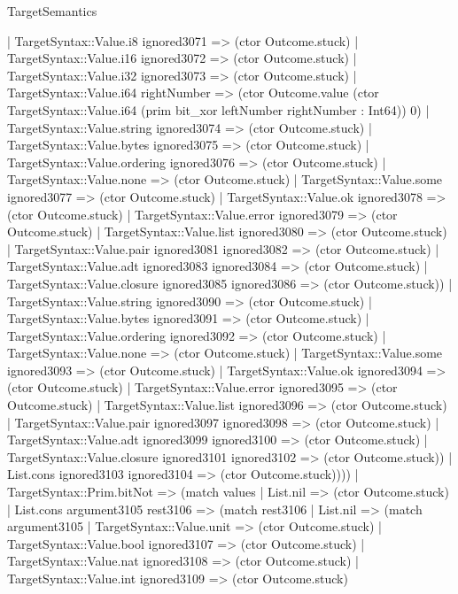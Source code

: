 \begin{lexlean}{TargetSemantics}
\begin{semanticmodule}
{              | TargetSyntax::Value.i8 ignored3071 => (ctor Outcome.stuck)
              | TargetSyntax::Value.i16 ignored3072 => (ctor Outcome.stuck)
              | TargetSyntax::Value.i32 ignored3073 => (ctor Outcome.stuck)
              | TargetSyntax::Value.i64 rightNumber => (ctor Outcome.value (ctor TargetSyntax::Value.i64 (prim bit_xor leftNumber rightNumber : Int64)) 0)
              | TargetSyntax::Value.string ignored3074 => (ctor Outcome.stuck)
              | TargetSyntax::Value.bytes ignored3075 => (ctor Outcome.stuck)
              | TargetSyntax::Value.ordering ignored3076 => (ctor Outcome.stuck)
              | TargetSyntax::Value.none => (ctor Outcome.stuck)
              | TargetSyntax::Value.some ignored3077 => (ctor Outcome.stuck)
              | TargetSyntax::Value.ok ignored3078 => (ctor Outcome.stuck)
              | TargetSyntax::Value.error ignored3079 => (ctor Outcome.stuck)
              | TargetSyntax::Value.list ignored3080 => (ctor Outcome.stuck)
              | TargetSyntax::Value.pair ignored3081 ignored3082 => (ctor Outcome.stuck)
              | TargetSyntax::Value.adt ignored3083 ignored3084 => (ctor Outcome.stuck)
              | TargetSyntax::Value.closure ignored3085 ignored3086 => (ctor Outcome.stuck))
            | TargetSyntax::Value.string ignored3090 => (ctor Outcome.stuck)
            | TargetSyntax::Value.bytes ignored3091 => (ctor Outcome.stuck)
            | TargetSyntax::Value.ordering ignored3092 => (ctor Outcome.stuck)
            | TargetSyntax::Value.none => (ctor Outcome.stuck)
            | TargetSyntax::Value.some ignored3093 => (ctor Outcome.stuck)
            | TargetSyntax::Value.ok ignored3094 => (ctor Outcome.stuck)
            | TargetSyntax::Value.error ignored3095 => (ctor Outcome.stuck)
            | TargetSyntax::Value.list ignored3096 => (ctor Outcome.stuck)
            | TargetSyntax::Value.pair ignored3097 ignored3098 => (ctor Outcome.stuck)
            | TargetSyntax::Value.adt ignored3099 ignored3100 => (ctor Outcome.stuck)
            | TargetSyntax::Value.closure ignored3101 ignored3102 => (ctor Outcome.stuck))
          | List.cons ignored3103 ignored3104 => (ctor Outcome.stuck))))
    | TargetSyntax::Prim.bitNot => (match values
      | List.nil => (ctor Outcome.stuck)
      | List.cons argument3105 rest3106 => (match rest3106
        | List.nil => (match argument3105
          | TargetSyntax::Value.unit => (ctor Outcome.stuck)
          | TargetSyntax::Value.bool ignored3107 => (ctor Outcome.stuck)
          | TargetSyntax::Value.nat ignored3108 => (ctor Outcome.stuck)
          | TargetSyntax::Value.int ignored3109 => (ctor Outcome.stuck)
}
\end{semanticmodule}
\end{lexlean}
